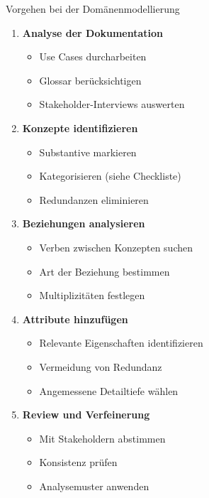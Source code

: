 \begin{KR}{Vorgehen bei der Domänenmodellierung}
\begin{enumerate}
    \item \textbf{Analyse der Dokumentation}
    \begin{itemize}
        \item Use Cases durcharbeiten
        \item Glossar berücksichtigen
        \item Stakeholder-Interviews auswerten
    \end{itemize}

    \item \textbf{Konzepte identifizieren}
    \begin{itemize}
        \item Substantive markieren
        \item Kategorisieren (siehe Checkliste)
        \item Redundanzen eliminieren
    \end{itemize}

    \item \textbf{Beziehungen analysieren}
    \begin{itemize}
        \item Verben zwischen Konzepten suchen
        \item Art der Beziehung bestimmen
        \item Multiplizitäten festlegen
    \end{itemize}

    \item \textbf{Attribute hinzufügen}
    \begin{itemize}
        \item Relevante Eigenschaften identifizieren
        \item Vermeidung von Redundanz
        \item Angemessene Detailtiefe wählen
    \end{itemize}

    \item \textbf{Review und Verfeinerung}
    \begin{itemize}
        \item Mit Stakeholdern abstimmen
        \item Konsistenz prüfen
        \item Analysemuster anwenden
    \end{itemize}
\end{enumerate}
\end{KR}

